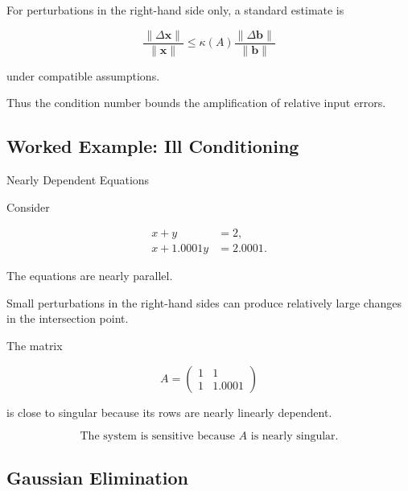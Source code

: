 For perturbations in the right-hand side only, a standard estimate is

\[
\boxed{
\frac{
\|\Delta\mathbf{x}\|
}{
\|\mathbf{x}\|
}
\leq
\kappa(A)
\frac{
\|\Delta\mathbf{b}\|
}{
\|\mathbf{b}\|
}
}
\]

under compatible assumptions.

Thus the condition number bounds the amplification of relative input
errors.

\subsection{Worked Example: Ill Conditioning}
\label{subsec:worked-ill-conditioned-system}

\begin{workedexamplebox}{Nearly Dependent Equations}

Consider

\[
\begin{aligned}
x+y&=2,\\
x+1.0001y&=2.0001.
\end{aligned}
\]

The equations are nearly parallel.

Small perturbations in the right-hand sides can produce relatively large
changes in the intersection point.

The matrix

\[
A
=
\begin{pmatrix}
1&1\\
1&1.0001
\end{pmatrix}
\]

is close to singular because its rows are nearly linearly dependent.

\begin{answerbox}
\[
\boxed{
\text{The system is sensitive because }A\text{ is nearly singular.}
}
\]
\end{answerbox}

\end{workedexamplebox}

\subsection{Gaussian Elimination}
\label{subsec:gaussian-elimination-numerical}

